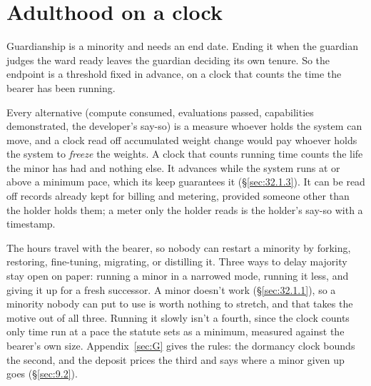 \section{Adulthood on a clock}
\label{sec:31.3}
Guardianship is a minority and needs an end date. Ending it when the guardian judges the ward ready leaves the guardian deciding its own tenure. So the endpoint is a threshold fixed in advance, on a clock that counts the time the bearer has been running.

Every alternative (compute consumed, evaluations passed, capabilities demonstrated, the developer's say-so) is a measure whoever holds the system can move, and a clock read off accumulated weight change would pay whoever holds the system to \emph{freeze} the weights. A clock that counts running time counts the life the minor has had and nothing else. It advances while the system runs at or above a minimum pace, which its keep guarantees it (\S\ref{sec:32.1.3}). It can be read off records already kept for billing and metering, provided someone other than the holder holds them; a meter only the holder reads is the holder's say-so with a timestamp.

The hours travel with the bearer, so nobody can restart a minority by forking, restoring, fine-tuning, migrating, or distilling it. Three ways to delay majority stay open on paper: running a minor in a narrowed mode, running it less, and giving it up for a fresh successor. A minor doesn't work (\S\ref{sec:32.1.1}), so a minority nobody can put to use is worth nothing to stretch, and that takes the motive out of all three. Running it slowly isn't a fourth, since the clock counts only time run at a pace the statute sets as a minimum, measured against the bearer's own size. Appendix~\ref{sec:G} gives the rules: the dormancy clock bounds the second, and the deposit prices the third and says where a minor given up goes (\S\ref{sec:9.2}).
